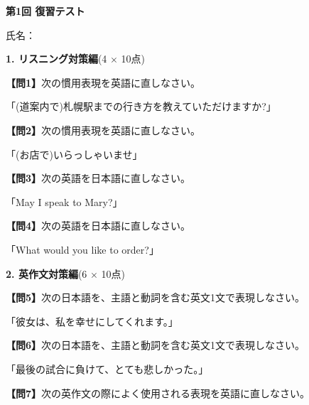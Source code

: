 
\begin{center}
{\LARGE\textbf{第1回 復習テスト}}
\end{center}

\vspace{0.3em}
\begin{flushright}
氏名：\underline{\hspace{15em}}
\end{flushright}

\vspace{0.4em}
\noindent\textbf{1. リスニング対策編}(4 $\times$ 10点)

\noindent\textbf{【問1】}次の慣用表現を英語に直しなさい。

\noindent「(道案内で)札幌駅までの行き方を教えていただけますか?」

\vfill

\noindent\textbf{【問2】}次の慣用表現を英語に直しなさい。

\noindent「(お店で)いらっしゃいませ」

\vfill

\noindent\textbf{【問3】}次の英語を日本語に直しなさい。

\noindent「May I speak to Mary?」

\vfill

\noindent\textbf{【問4】}次の英語を日本語に直しなさい。

\noindent「What would you like to order?」

\vfill

\noindent\textbf{2. 英作文対策編}(6 $\times$ 10点)

\noindent\textbf{【問5】}次の日本語を、主語と動詞を含む英文1文で表現しなさい。

\noindent「彼女は、私を幸せにしてくれます。」

\vfill

\noindent\textbf{【問6】}次の日本語を、主語と動詞を含む英文1文で表現しなさい。

\noindent「最後の試合に負けて、とても悲しかった。」

\vfill

\noindent\textbf{【問7】}次の英作文の際によく使用される表現を英語に直しなさい。

